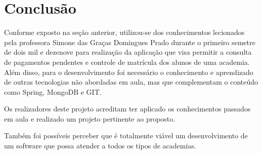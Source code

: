 \chapter{Conclusão}\label{cap_conclu}

Conforme exposto na seção anterior, utilizou-se dos conhecimentos lecionados pela professora Simone das Graças Domingues Prado durante o primeiro semetre de dois mil e dezenove para realização da aplicação que visa permitir a consulta de pagamentos pendentes e controle de matrícula dos alunos de uma academia. Além disso, para o desenvolvimento foi necessário o conhecimento e aprendizado de outras tecnologias não abordadas em aula, mas que complementam o conteúdo como Spring, MongoDB e GIT.

Os realizadores deste projeto acreditam ter aplicado os conhecimentos passados em aula e realizado um projeto pertinente ao proposto.

Também foi possíveis perceber que é totalmente viável um desenvolvimento de um software que possa atender a todos os tipos de academias.
